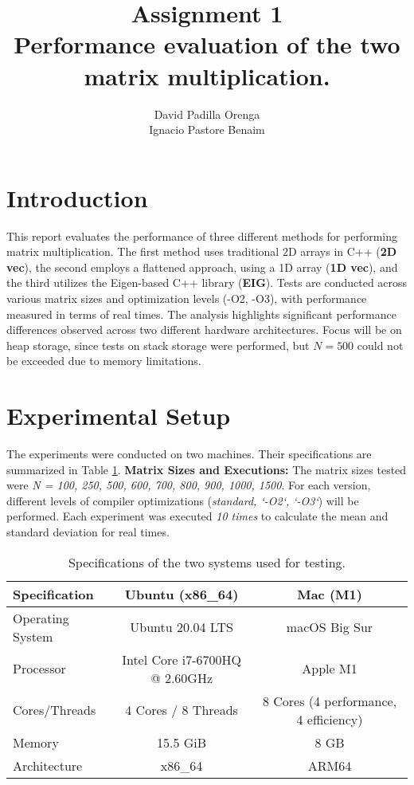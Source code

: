 \documentclass{article}
\title{Assignment 1 \\ \small Performance evaluation of the two matrix multiplication.}
\author{David Padilla Orenga\\ Ignacio Pastore Benaim}
\date{}  %
\begin{document}
\maketitle

\section{Introduction}

This report evaluates the performance of three different methods for performing matrix multiplication. The first method uses traditional 2D arrays in C++ (\textbf{2D vec}), the second employs a flattened approach, using a 1D array (\textbf{1D vec}), and the third utilizes the Eigen-based C++ library (\textbf{EIG}). Tests are conducted across various matrix sizes and optimization levels (-O2, -O3), with performance measured in terms of real times. The analysis highlights significant performance differences observed across two different hardware architectures. Focus will be on heap storage, since tests on stack storage were performed, but \( N = 500 \) could not be exceeded due to memory limitations.
  
\section{Experimental Setup}

The experiments were conducted on two machines. Their specifications are summarized in Table \ref{tab:specs}. \textbf{Matrix Sizes and Executions:} The matrix sizes tested were \textit{N = 100, 250, 500, 600, 700, 800, 900, 1000, 1500}. For each version, different levels of compiler optimizations (\textit{standard, `-O2`, `-O3`}) will be performed. Each experiment was executed \textit{10 times} to calculate the mean and standard deviation for real times.

\begin{table}[h]
\centering
\begin{tabular}{|l|c|c|}
\hline
\textbf{Specification} & \textbf{Ubuntu (x86\_64)} & \textbf{Mac (M1)} \\ \hline
Operating System       & Ubuntu 20.04 LTS          & macOS Big Sur     \\ \hline
Processor              & Intel Core i7-6700HQ @ 2.60GHz & Apple M1         \\ \hline
Cores/Threads          & 4 Cores / 8 Threads       & 8 Cores (4 performance, 4 efficiency) \\ \hline
Memory                 & 15.5 GiB                  & 8 GB              \\ \hline
Architecture           & x86\_64                   & ARM64             \\ \hline
\end{tabular}
\caption{Specifications of the two systems used for testing.}
\label{tab:specs}
\end{table}
\end{document}
